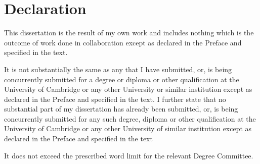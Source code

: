 \chapter*{Declaration}


This dissertation is the result of my own work and includes nothing which is the outcome of work done in collaboration except as declared in the Preface and specified in the text.

It is not substantially the same as any that I have submitted, or, is being concurrently submitted for a degree or diploma or other qualification at the University of Cambridge or any other University or similar institution except as declared in the Preface and specified in the text. I further state that no substantial part of my dissertation has already been submitted, or, is being concurrently submitted for any such degree, diploma or other qualification at the University of Cambridge or any other University of similar institution except as declared in the Preface and specified in the text


It does not exceed the prescribed word limit for the relevant Degree Committee.  


\cleardoublepage{}
